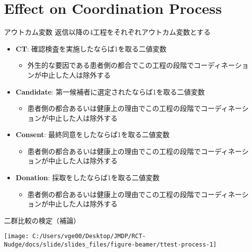 \documentclass[
      aspectratio=169,
        12pt,
    ]{beamer}
\renewcommand{\textbf}[1]{{\color{DarkBlue}\bfseries#1}}
\providecommand{\tightlist}{%
  \setlength{\itemsep}{0pt}\setlength{\parskip}{0pt}}
\begin{document}
\hypertarget{effect-on-coordination-process}{%
\section{Effect on Coordination Process}\label{effect-on-coordination-process}}

\begin{frame}{アウトカム変数}
\protect\hypertarget{ux30a2ux30a6ux30c8ux30abux30e0ux5909ux6570-1}{}
返信以降の4工程をそれぞれアウトカム変数とする

\begin{itemize}
\tightlist
\item
  \textbf{CT}: 確認検査を実施したならば1を取る二値変数

  \begin{itemize}
  \tightlist
  \item
    外生的な要因である患者側の都合でこの工程の段階でコーディネーションが中止した人は除外する
  \end{itemize}
\item
  \textbf{Candidate}: 第一候補者に選定されたならば1を取る二値変数

  \begin{itemize}
  \tightlist
  \item
    患者側の都合あるいは健康上の理由でこの工程の段階でコーディネーションが中止した人は除外する
  \end{itemize}
\item
  \textbf{Consent}: 最終同意をしたならば1を取る二値変数

  \begin{itemize}
  \tightlist
  \item
    患者側の都合あるいは健康上の理由でこの工程の段階でコーディネーションが中止した人は除外する
  \end{itemize}
\item
  \textbf{Donation}: 採取をしたならば1を取る二値変数

  \begin{itemize}
  \tightlist
  \item
    患者側の都合あるいは健康上の理由でこの工程の段階でコーディネーションが中止した人は除外する
  \end{itemize}
\end{itemize}
\end{frame}

\begin{frame}{二群比較の検定（補論）}
\protect\hypertarget{ux4e8cux7fa4ux6bd4ux8f03ux306eux691cux5b9aux88dcux8ad6}{}
\begin{center}\texttt{[image: C:/Users/vge00/Desktop/JMDP/RCT-Nudge/docs/slide/slides\_files/figure-beamer/ttest-process-1]} \end{center}
\end{frame}
\end{document}
